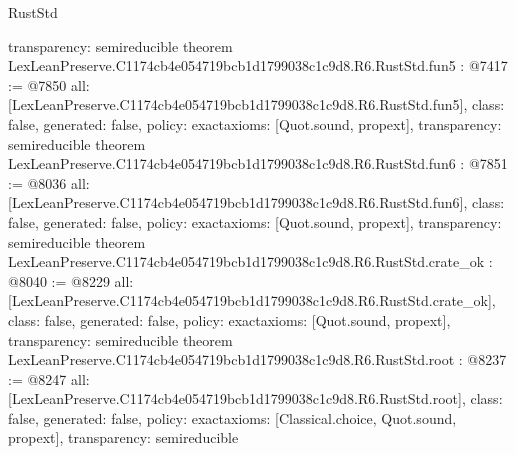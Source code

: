 \begin{lexlean}{RustStd}
\begin{coremodule}
{  transparency: semireducible
}
theorem LexLeanPreserve.C1174cb4e054719bcb1d1799038c1c9d8.R6.RustStd.fun5 : @7417 := @7850 {
  all: [LexLeanPreserve.C1174cb4e054719bcb1d1799038c1c9d8.R6.RustStd.fun5],
  class: false,
  generated: false,
  policy: exact{axioms: [Quot.sound, propext]},
  transparency: semireducible
}
theorem LexLeanPreserve.C1174cb4e054719bcb1d1799038c1c9d8.R6.RustStd.fun6 : @7851 := @8036 {
  all: [LexLeanPreserve.C1174cb4e054719bcb1d1799038c1c9d8.R6.RustStd.fun6],
  class: false,
  generated: false,
  policy: exact{axioms: [Quot.sound, propext]},
  transparency: semireducible
}
theorem LexLeanPreserve.C1174cb4e054719bcb1d1799038c1c9d8.R6.RustStd.crate_ok : @8040 := @8229 {
  all: [LexLeanPreserve.C1174cb4e054719bcb1d1799038c1c9d8.R6.RustStd.crate_ok],
  class: false,
  generated: false,
  policy: exact{axioms: [Quot.sound, propext]},
  transparency: semireducible
}
theorem LexLeanPreserve.C1174cb4e054719bcb1d1799038c1c9d8.R6.RustStd.root : @8237 := @8247 {
  all: [LexLeanPreserve.C1174cb4e054719bcb1d1799038c1c9d8.R6.RustStd.root],
  class: false,
  generated: false,
  policy: exact{axioms: [Classical.choice, Quot.sound, propext]},
  transparency: semireducible
}


\end{coremodule}
\end{lexlean}
